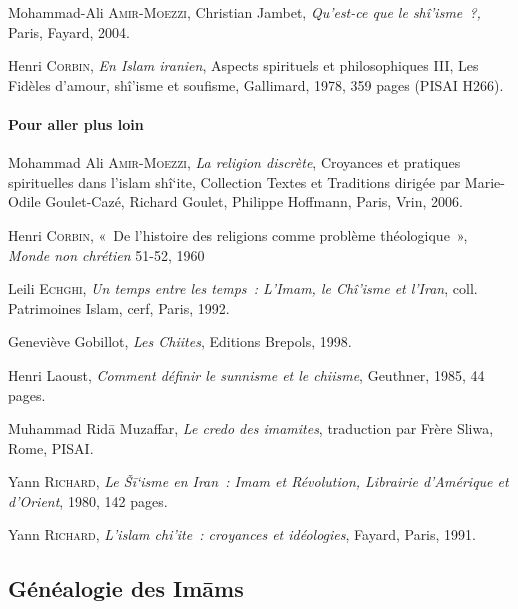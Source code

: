 Mohammad-Ali \textsc{Amir-Moezzi}, Christian Jambet, \emph{Qu'est-ce que
le shî'isme~?,} Paris, Fayard, 2004.

Henri \textsc{Corbin}, \emph{En Islam iranien}, Aspects spirituels et
philosophiques III, Les Fidèles d'amour, shî'isme et soufisme,
Gallimard, 1978, 359 pages (PISAI H266).

\paragraph{Pour aller plus loin}

Mohammad Ali \textsc{Amir-Moezzi}, \emph{La religion discrète},
Croyances et pratiques spirituelles dans l'islam shî`ite, Collection
Textes et Traditions dirigée par Marie-Odile Goulet-Cazé, Richard
Goulet, Philippe Hoffmann, Paris, Vrin, 2006.

Henri \textsc{Corbin}, «~De l'histoire des religions comme problème
théologique~», \emph{Monde non chrétien} 51-52, 1960

Leili \textsc{Echghi}, \emph{Un temps entre les temps~: L'Imam, le
Chî'isme et l'Iran}, coll. Patrimoines Islam, cerf, Paris, 1992.

Geneviève Gobillot, \emph{Les Chiites}, Editions Brepols, 1998.

Henri Laoust, \emph{Comment définir le sunnisme et le chiisme},
Geuthner, 1985, 44 pages.

Muhammad Ridā Muzaffar, \emph{Le credo des imamites}, traduction par
Frère Sliwa, Rome, PISAI.

Yann \textsc{Richard}, \emph{Le Šī`isme en Iran~: Imam et Révolution,
Librairie d'Amérique et d'Orient}, 1980, 142 pages.

Yann \textsc{Richard}, \emph{L'islam chi'ite~: croyances et idéologies},
Fayard, Paris, 1991.

\textbf{\hfill\break
}

\subsection{Généalogie des Imāms}


 

